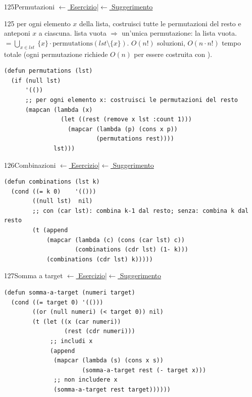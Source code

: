 \label{sol:125}
\begin{solbox}{125}{Permutazioni}
\small\color{black!55}\hyperref[ex:125]{$\leftarrow$ Esercizio}\enspace\textcolor{black!30}{|}\enspace\hyperref[hint:125]{$\leftarrow$ Suggerimento}\normalsize\color{black}
\begin{ragionamentoBox}{125}
 per ogni elemento $x$ della lista, costruisci tutte
le permutazioni del resto e anteponi $x$ a ciascuna.
 lista vuota $\Rightarrow$ un'unica permutazione: la lista vuota.
  $=
\bigcup_{x \in lst}\ \{x\} \cdot \text{permutations}(lst \setminus \{x\})$.
 $O(n!)$ soluzioni, $O(n \cdot n!)$ tempo totale
(ogni permutazione richiede $O(n)$ per essere costruita con ).
\end{ragionamentoBox}
\begin{lstlisting}
(defun permutations (lst)
  (if (null lst)
      '(())
      ;; per ogni elemento x: costruisci le permutazioni del resto
      (mapcan (lambda (x)
                (let ((rest (remove x lst :count 1)))
                  (mapcar (lambda (p) (cons x p))
                          (permutations rest))))
              lst)))
\end{lstlisting}
\end{solbox}

\label{sol:126}
\begin{solbox}{126}{Combinazioni}
\small\color{black!55}\hyperref[ex:126]{$\leftarrow$ Esercizio}\enspace\textcolor{black!30}{|}\enspace\hyperref[hint:126]{$\leftarrow$ Suggerimento}\normalsize\color{black}
\begin{lstlisting}
(defun combinations (lst k)
  (cond ((= k 0)    '(()))
        ((null lst)  nil)
        ;; con (car lst): combina k-1 dal resto; senza: combina k dal resto
        (t (append
            (mapcar (lambda (c) (cons (car lst) c))
                    (combinations (cdr lst) (1- k)))
            (combinations (cdr lst) k)))))
\end{lstlisting}
\end{solbox}

\label{sol:127}
\begin{solbox}{127}{Somma a target}
\small\color{black!55}\hyperref[ex:127]{$\leftarrow$ Esercizio}\enspace\textcolor{black!30}{|}\enspace\hyperref[hint:127]{$\leftarrow$ Suggerimento}\normalsize\color{black}
\begin{lstlisting}
(defun somma-a-target (numeri target)
  (cond ((= target 0) '(()))
        ((or (null numeri) (< target 0)) nil)
        (t (let ((x (car numeri))
                 (rest (cdr numeri)))
             ;; includi x
             (append
              (mapcar (lambda (s) (cons x s))
                      (somma-a-target rest (- target x)))
              ;; non includere x
              (somma-a-target rest target))))))
\end{lstlisting}
\end{solbox}


